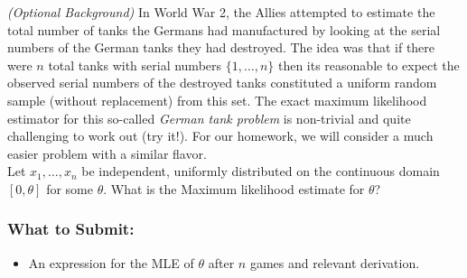 \documentclass{article}
\begin{document}
\begin{aprob}
     \textit{(Optional Background)} In World War 2, the Allies attempted to estimate the total number of tanks the Germans had manufactured by looking at the serial numbers of the German tanks they had destroyed. The idea was that if there were $n$ total tanks with serial numbers $\{1,\dots,n\}$ then its reasonable to expect the observed serial numbers of the destroyed tanks constituted a uniform random sample (without replacement) from this set. The exact maximum likelihood estimator for this so-called \emph{German tank problem} is non-trivial and quite challenging to work out (try it!). For our homework, we will consider a much easier problem with a similar flavor.\\

    Let $x_1,\dots,x_n$ be independent, uniformly distributed on the continuous domain $[0,\theta]$ for some $\theta$. What is the Maximum likelihood estimate for $\theta$?
    \subsubsection*{What to Submit:}
    \begin{itemize}
        \item An expression for the MLE of $\theta$ after $n$ games and relevant derivation.
    \end{itemize}
\end{aprob}
\end{document}
